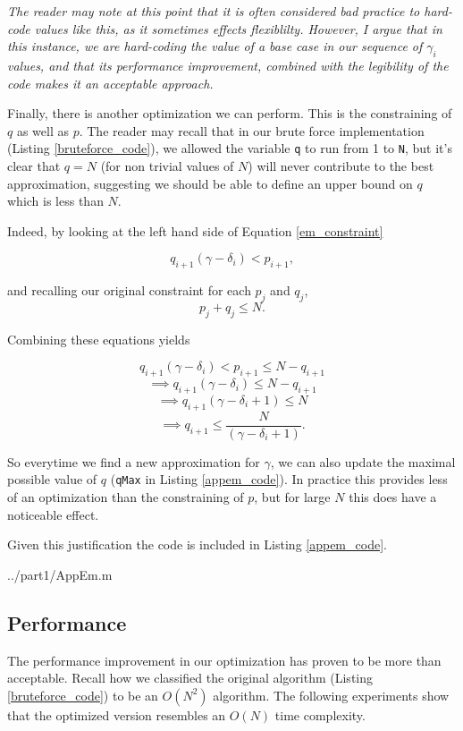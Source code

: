 \documentclass[10pt]{article}
\newcommand*{\gam}{$\gamma$}
\newcommand*{\gami}{$\gamma_{i}$}
\begin{document}
\emph{The reader may note at this point that it is often considered bad practice to hard-code values like this, as it sometimes effects flexiblilty. However, I argue that in this instance, we are hard-coding the value of a base case in our sequence of \gami $ $ values, and that its performance improvement, combined with the legibility of the code makes it an acceptable approach.}

Finally, there is another optimization we can perform.  This is the constraining of $q$ as well as $p$. The reader may recall that in our brute force implementation (Listing \ref{bruteforce_code}), we allowed the variable \texttt{q} to run from 1 to \texttt{N}, but it's clear that $q = N$ (for non trivial values of $N$) will never contribute to the best approximation, suggesting we should be able to define an upper bound on $q$ which is less than $N$.

Indeed, by looking at the left hand side of Equation \ref{em_constraint}

$$q_{i+1} (\gamma - \delta_i) < p_{i+1} ,$$

and recalling our original constraint for each $p_j$ and $q_j$,
$$ p_j + q_j \leq N .$$

Combining these equations yields

$$ q_{i+1} (\gamma - \delta_i) < p_{i+1} \leq N - q_{i+1}$$ 
$$ \implies  q_{i+1} (\gamma - \delta_i) \leq N - q_{i+1} $$ 
$$ \implies q_{i+1} (\gamma - \delta_i + 1) \leq N  $$ 
$$ \implies q_{i+1}  \leq \frac{N}{(\gamma - \delta_i + 1)}  .$$ 

So everytime we find a new approximation for \gam, we can also update the maximal possible value of $q$ (\texttt{qMax} in Listing \ref{appem_code}). In practice this provides less of an optimization than the constraining of $p$, but for large $N$ this does have a noticeable effect.

Given this justification the code is included in Listing \ref{appem_code}.

   {../part1/AppEm.m}

\subsection{Performance}

The performance improvement in our optimization has proven to be more than acceptable. Recall how we classified the original algorithm (Listing \ref{bruteforce_code}) to be an $O(N^2)$ algorithm. The following experiments show that the optimized version resembles an $O(N)$ time complexity.
\end{document}
